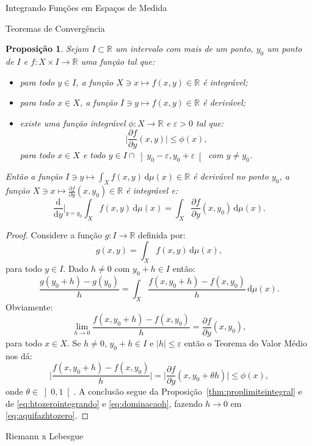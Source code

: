 \documentclass[oneside,final,11pt]{amsbook}
\newcommand{\R}{\mathds R}
\newcommand{\dd}{\mathrm d}
\theoremstyle{remark}\newtheorem{exercise}{Exercício}[chapter]
\theoremstyle{remark}\newtheorem{*exercise}[exercise]{\hbox to 0pt{\hskip 0pt minus 1fil*}Exercício}
\theoremstyle{definition}\newtheorem{exdefin}{Definição}[chapter]
\theoremstyle{plain}\newtheorem{teo}{Teorema}[section]
\theoremstyle{plain}\newtheorem{lem}[teo]{Lema}
\theoremstyle{plain}\newtheorem{prop}[teo]{Proposição}
\theoremstyle{plain}\newtheorem{cor}[teo]{Corolário}
\theoremstyle{definition}\newtheorem{defin}[teo]{Definição}
\theoremstyle{remark}\newtheorem{rem}[teo]{Observação}
\theoremstyle{definition}\newtheorem{notation}[teo]{Notação}
\theoremstyle{definition}\newtheorem{convention}[teo]{Convenção}
\theoremstyle{definition}\newtheorem{example}[teo]{Exemplo}
\numberwithin{section}{chapter}
\numberwithin{equation}{section}
\begin{document}
\begin{chapter}{Integrando Funções em Espaços de Medida}
\begin{section}{Teoremas de Convergência}
\begin{prop}
Sejam $I\subset\R$ um intervalo com mais de um ponto, $y_0$ um ponto de $I$ e $f:X\times I\to\R$
uma função tal que:
\begin{itemize}
\item para todo $y\in I$, a função $X\ni x\mapsto f(x,y)\in\R$ é integrável;
\item para todo $x\in X$, a função $I\ni y\mapsto f(x,y)\in\R$ é derivável;
\item existe uma função integrável $\phi:X\to\R$ e $\varepsilon>0$ tal que:
\[\Big\vert\frac{\partial f}{\partial y}(x,y)\Big\vert\le\phi(x),\]
para todo $x\in X$ e todo $y\in I\cap\left]y_0-\varepsilon,y_0+\varepsilon\right[$ com $y\ne y_0$.
\end{itemize}
Então a função $I\ni y\mapsto\int_Xf(x,y)\,\dd\mu(x)\in\R$ é derivável no ponto $y_0$,
a função $X\ni x\mapsto\frac{\partial f}{\partial y}(x,y_0)\in\R$ é integrável e:
\[\frac{\dd}{\dd y}\Big\vert_{y=y_0}\int_Xf(x,y)\,\dd\mu(x)=\int_X\frac{\partial f}{\partial y}(x,y_0)\,\dd\mu(x).\]
\end{prop}
\begin{proof}
Considere a função $g:I\to\R$ definida por:
\[g(x,y)=\int_Xf(x,y)\,\dd\mu(x),\]
para todo $y\in I$. Dado $h\ne0$ com $y_0+h\in I$ então:
\begin{equation}\label{eq:aquifazhtozero}
\frac{g(y_0+h)-g(y_0)}h=\int_X\frac{f(x,y_0+h)-f(x,y_0)}h\,\dd\mu(x).
\end{equation}
Obviamente:
\begin{equation}\label{eq:htozerointegrando}
\lim_{h\to0}\frac{f(x,y_0+h)-f(x,y_0)}h=\frac{\partial f}{\partial y}(x,y_0),
\end{equation}
para todo $x\in X$. Se $h\ne0$, $y_0+h\in I$ e $\vert h\vert\le\varepsilon$ então o Teorema
do Valor Médio nos dá:
\begin{equation}\label{eq:dominacaoh}
\Big\vert\frac{f(x,y_0+h)-f(x,y_0)}h\Big\vert=\Big\vert\frac{\partial f}{\partial y}(x,y_0+\theta h)\Big\vert
\le\phi(x),
\end{equation}
onde $\theta\in\left]0,1\right[$. A conclusão segue da Proposição~\ref{thm:proplimiteintegral}
e de \eqref{eq:htozerointegrando} e \eqref{eq:dominacaoh}, fazendo $h\to0$ em \eqref{eq:aquifazhtozero}.
\end{proof}

\end{section}

\begin{section}{Riemann x Lebesgue}


\end{section}
\end{chapter}
\end{document}
